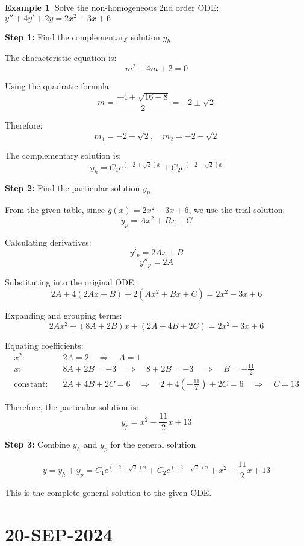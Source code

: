 \documentclass{article}
\theoremstyle{definition}
\newtheorem{example}{Example}[section]
\begin{document}
    \begin{example}
    Solve the non-homogeneous 2nd order ODE: $y'' + 4y' + 2y = 2x^2 - 3x + 6$
    
    \textbf{Step 1:} Find the complementary solution $y_h$
    
    The characteristic equation is:
    \[ m^2 + 4m + 2 = 0 \]
    
    Using the quadratic formula:
    \[ m = \frac{-4 \pm \sqrt{16 - 8}}{2} = -2 \pm \sqrt{2} \]
    
    Therefore:
    \[ m_1 = -2 + \sqrt{2}, \quad m_2 = -2 - \sqrt{2} \]
    
    The complementary solution is:
    \[ y_h = C_1e^{(-2+\sqrt{2})x} + C_2e^{(-2-\sqrt{2})x} \]
    
    \textbf{Step 2:} Find the particular solution $y_p$
    
    From the given table, since $g(x) = 2x^2 - 3x + 6$, we use the trial solution:
    \[ y_p = Ax^2 + Bx + C \]
    
    Calculating derivatives:
    \[ y'_p = 2Ax + B \]
    \[ y''_p = 2A \]
    
    Substituting into the original ODE:
    \[ 2A + 4(2Ax + B) + 2(Ax^2 + Bx + C) = 2x^2 - 3x + 6 \]
    
    Expanding and grouping terms:
    \[ 2Ax^2 + (8A + 2B)x + (2A + 4B + 2C) = 2x^2 - 3x + 6 \]
    
    Equating coefficients:
    \begin{align*}
    x^2: & \quad 2A = 2 \quad \Rightarrow \quad A = 1 \\
    x: & \quad 8A + 2B = -3 \quad \Rightarrow \quad 8 + 2B = -3 \quad \Rightarrow \quad B = -\frac{11}{2} \\
    \text{constant}: & \quad 2A + 4B + 2C = 6 \quad \Rightarrow \quad 2 + 4(-\frac{11}{2}) + 2C = 6 \quad \Rightarrow \quad C = 13
    \end{align*}
    
    Therefore, the particular solution is:
    \[ y_p = x^2 - \frac{11}{2}x + 13 \]
    
    \textbf{Step 3:} Combine $y_h$ and $y_p$ for the general solution
    
    \[ y = y_h + y_p = C_1e^{(-2+\sqrt{2})x} + C_2e^{(-2-\sqrt{2})x} + x^2 - \frac{11}{2}x + 13 \]
    
    This is the complete general solution to the given ODE.
    \end{example}

\section{20-SEP-2024}
\end{document}
